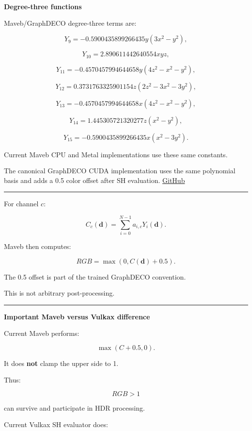 \textbf{Degree-three functions}

Maveb/GraphDECO degree-three terms are:

\[
Y_9=
-0.5900435899266435
y(3x^2-y^2),
\]

\[
Y_{10}
=
2.890611442640554xyz,
\]

\[
Y_{11}
=
-0.4570457994644658
y(4z^2-x^2-y^2),
\]

\[
Y_{12}
=
0.3731763325901154
z(2z^2-3x^2-3y^2),
\]

\[
Y_{13}
=
-0.4570457994644658
x(4z^2-x^2-y^2),
\]

\[
Y_{14}
=
1.445305721320277
z(x^2-y^2),
\]

\[
Y_{15}
=
-0.5900435899266435
x(x^2-3y^2).
\]

Current Maveb CPU and Metal implementations use these same constants.

The canonical GraphDECO CUDA implementation uses the same polynomial basis and adds a 0.5 color offset after SH evaluation. \href{https://github.com/graphdeco-inria/diff-gaussian-rasterization/blob/main/cuda_rasterizer/forward.cu?utm_source=chatgpt.com}{GitHub}

\begin{center}\rule{0.5\linewidth}{0.5pt}\end{center}

For channel \(c\):

\[
C_c(\mathbf d)
=
\sum_{i=0}^{N-1}
a_{i,c}Y_i(\mathbf d).
\]

Maveb then computes:

\[
\boxed{
RGB=
\max(
0,
C(\mathbf d)+0.5
).
}
\]

The 0.5 offset is part of the trained GraphDECO convention.

This is not arbitrary post-processing.

\begin{center}\rule{0.5\linewidth}{0.5pt}\end{center}

\textbf{Important Maveb versus Vulkax difference}

Current Maveb performs:

\[
\max(C+0.5,0).
\]

It does \textbf{not} clamp the upper side to 1.

Thus:

\[
RGB>1
\]

can survive and participate in HDR processing.

Current Vulkax SH evaluator does:

